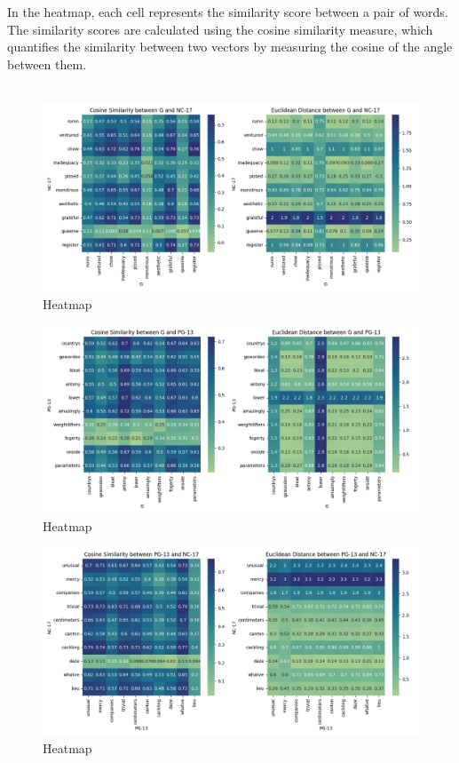 \documentclass[a4paper]{article}
\begin{document}
In the heatmap, each cell represents the similarity score between a pair of words. The similarity scores are calculated using the cosine similarity measure, which quantifies the similarity between two vectors by measuring the cosine of the angle between them.\\\\

\begin{figure}[ht]
    \centering
    \includegraphics[width=1\textwidth]{../stats/HeatMap_G_NC-17.png}
    \caption{Heatmap}
\end{figure}

\begin{figure}[ht]
    \centering
    \includegraphics[width=1\textwidth]{../stats/HeatMap_G_PG-13.png}
    \caption{Heatmap}
\end{figure}

\begin{figure}[ht]
    \centering
    \includegraphics[width=1\textwidth]{../stats/HeatMap_PG-13_NC-17.png}
    \caption{Heatmap}
\end{figure}
\end{document}
